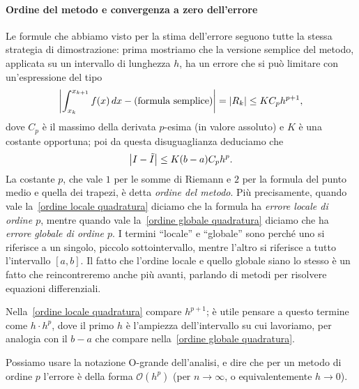 \documentclass[a4paper]{report}
\DeclarePairedDelimiter{\abs}{\lvert}{\rvert}
\theoremstyle{definiton}
\theoremstyle{remark}
\begin{document}
\paragraph{Ordine del metodo e convergenza a zero dell'errore}
Le formule che abbiamo visto per la stima dell'errore seguono tutte la stessa strategia di dimostrazione: prima mostriamo che la versione semplice del metodo, applicata su un intervallo di lunghezza $h$, ha un errore che si può limitare con un'espressione del tipo
\begin{equation} \label{ordine locale quadratura}
    \abs*{\int_{x_k}^{x_{k+1}} f(x)\, dx - (\text{formula semplice})} = \abs{R_k} \leq K C_p h^{p+1},    
\end{equation}
dove $C_p$ è il massimo della derivata $p$-esima (in valore assoluto) e $K$ è una costante opportuna; poi da questa disuguaglianza deduciamo che
\begin{equation} \label{ordine globale quadratura}
    \abs*{I - \tilde{I}} \leq K (b-a) C_p h^p.
\end{equation}
La costante $p$, che vale $1$ per le somme di Riemann e $2$ per la formula del punto medio e quella dei trapezi, è detta \emph{ordine del metodo}. Più precisamente, quando vale la~\eqref{ordine locale quadratura} diciamo che la formula ha \emph{errore locale di ordine $p$}, mentre quando vale la~\eqref{ordine globale quadratura} diciamo che ha \emph{errore globale di ordine $p$}. I termini ``locale'' e ``globale'' sono perché uno si riferisce a un singolo, piccolo sottointervallo, mentre l'altro si riferisce a tutto l'intervallo $[a,b]$. Il fatto che l'ordine locale e quello globale siano lo stesso è un fatto che reincontreremo anche più avanti, parlando di metodi per risolvere equazioni differenziali.

Nella~\eqref{ordine locale quadratura} compare $h^{p+1}$; è utile pensare a questo termine come $h \cdot h^p$, dove il primo $h$ è l'ampiezza dell'intervallo su cui lavoriamo, per analogia con il $b-a$ che compare nella~\eqref{ordine globale quadratura}.

Possiamo usare la notazione O-grande dell'analisi, e dire che per un metodo di ordine $p$ l'errore è della forma $\mathcal{O}(h^p)$ (per $n\to\infty$, o equivalentemente $h\to 0$).
\end{document}
